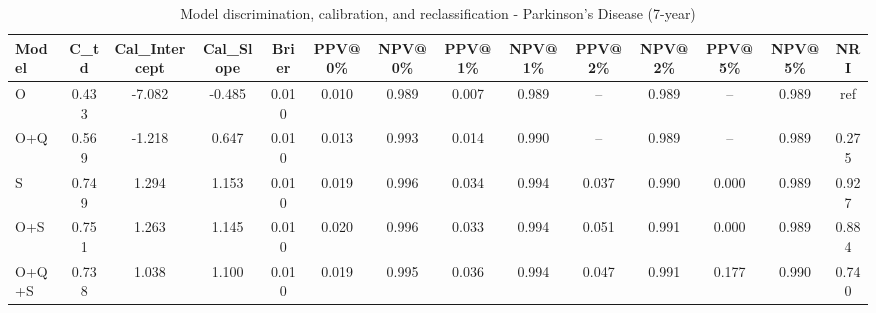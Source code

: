 \begin{table}[htbp]
\centering
\small
\caption{Model discrimination, calibration, and reclassification - Parkinson's Disease (7-year)}
\label{tab:perf_pd_7y}
\begin{tabular}{lccccccccccccc}
\toprule
Model & C\_td & Cal\_Intercept & Cal\_Slope & Brier & PPV@0\% & NPV@0\% & PPV@1\% & NPV@1\% & PPV@2\% & NPV@2\% & PPV@5\% & NPV@5\% & NRI \\
\midrule
O & 0.433 & -7.082 & -0.485 & 0.010 & 0.010 & 0.989 & 0.007 & 0.989 & -- & 0.989 & -- & 0.989 & ref \\
O+Q & 0.569 & -1.218 & 0.647 & 0.010 & 0.013 & 0.993 & 0.014 & 0.990 & -- & 0.989 & -- & 0.989 & 0.275 \\
S & 0.749 & 1.294 & 1.153 & 0.010 & 0.019 & 0.996 & 0.034 & 0.994 & 0.037 & 0.990 & 0.000 & 0.989 & 0.927 \\
O+S & 0.751 & 1.263 & 1.145 & 0.010 & 0.020 & 0.996 & 0.033 & 0.994 & 0.051 & 0.991 & 0.000 & 0.989 & 0.884 \\
O+Q+S & 0.738 & 1.038 & 1.100 & 0.010 & 0.019 & 0.995 & 0.036 & 0.994 & 0.047 & 0.991 & 0.177 & 0.990 & 0.740 \\
\bottomrule
\end{tabular}
\end{table}